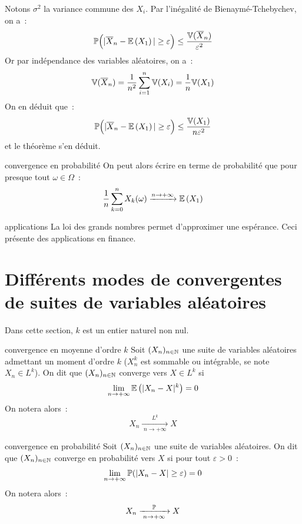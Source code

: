 \begin{demonstration}
    Notons $\sigma^2$ la variance commune des $X_i$.    Par l'inégalité de Bienaymé-Tchebychev, on a~:
    $$\mathbb{P}\Big( \vert \overline{X}_n - \mathbb{E}\left(X_1\right) \vert \geq \varepsilon\Big) \leq \frac{\mathbb{V}({\overline{X}_n})}{\varepsilon^2}$$
    Or par indépendance des variables aléatoires, on a~:
    $$\mathbb{V}({\overline{X}_n}) = \frac{1}{n^2}\sum_{i=1}^n\mathbb{V}({X_i}) = \frac{1}{n}\mathbb{V}({X_1})$$
    On en déduit que~:
    $$\mathbb{P}\Big( \vert \overline{X}_n - \mathbb{E}\left(X_1\right) \vert \geq \varepsilon\Big) \leq \frac{\mathbb{V}({X_1})}{n\varepsilon^2}$$
    et le théorème s'en déduit.
\end{demonstration}

\begin{remarque}{}{convergence en probabilité}
    On peut alors écrire en terme de probabilité que pour presque tout $\omega \in \Omega$~:
    $$\frac{1}{n} \sum_{k=0}^nX_k(\omega) \xrightarrow{n \to +\infty} \mathbb{E}\left(X_1\right)$$
\end{remarque}

\begin{remarque}{}{applications}
    La loi des grands nombres permet d'approximer une espérance. Ceci présente des applications en finance.
\end{remarque}

\section{Différents modes de convergentes de suites de variables aléatoires}
Dans cette section, $k$ est un entier naturel non nul.
\begin{definition}{}{convergence en moyenne d'ordre $k$}
    Soit $(X_n)_{n \in \mathbb{N}}$ une suite de variables aléatoires admettant un moment d'ordre $k$ ($X_n^k$ est sommable ou intégrable, se note $X_n \in L^k$). On dit que $(X_n)_{n \in \mathbb{N}}$ converge vers $X \in L^k$ si 
    $$\lim_{n \to +\infty} \mathbb{E}\left(\vert X_n - X \vert^k\right) = 0$$
    On notera alors~:
    $$X_n \xrightarrow[\;n \to +\infty\;]{L^k} X$$
    
\end{definition}

\begin{definition}{}{convergence en probabilité}
    Soit $(X_n)_{n \in \mathbb{N}}$ une suite de variables aléatoires. On dit que $(X_n)_{n \in \mathbb{N}}$ converge en probabilité vers $X$ si pour tout $\varepsilon > 0$~:
    $$\lim_{n \to +\infty} \mathbb{P}(\vert X_n - X \vert \geq \varepsilon) = 0$$
    On notera alors~:
        $$X_n \xrightarrow[\;n \to +\infty\;]{\mathbb{P}} X$$
\end{definition}

